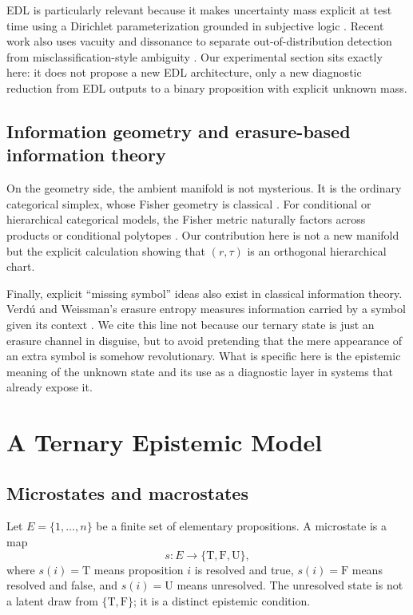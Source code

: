 \documentclass[11pt]{article}
\newcommand{\T}{\mathrm{T}}
\newcommand{\F}{\mathrm{F}}
\newcommand{\U}{\mathrm{U}}
\newcommand{\1}{\mathbf{1}}
\begin{document}
EDL is particularly relevant because it makes uncertainty mass explicit at test time using a Dirichlet parameterization grounded in subjective logic \citep{SensoyKaplanKandemir18}. Recent work also uses vacuity and dissonance to separate out-of-distribution detection from misclassification-style ambiguity \citep{AguilarRaducanuRadevaVanDeWeijer23}. Our experimental section sits exactly here: it does not propose a new EDL architecture, only a new diagnostic reduction from EDL outputs to a binary proposition with explicit unknown mass.

\subsection{Information geometry and erasure-based information theory}

On the geometry side, the ambient manifold is not mysterious. It is the ordinary categorical simplex, whose Fisher geometry is classical \citep{Amari16}. For conditional or hierarchical categorical models, the Fisher metric naturally factors across products or conditional polytopes \citep{MontufarRauhAy14}. Our contribution here is not a new manifold but the explicit calculation showing that $(r,\tau)$ is an orthogonal hierarchical chart.

Finally, explicit “missing symbol” ideas also exist in classical information theory. Verd\'u and Weissman's erasure entropy measures information carried by a symbol given its context \citep{VerduWeissman08}. We cite this line not because our ternary state is just an erasure channel in disguise, but to avoid pretending that the mere appearance of an extra symbol is somehow revolutionary. What is specific here is the epistemic meaning of the unknown state and its use as a diagnostic layer in systems that already expose it.

\section{A Ternary Epistemic Model}

\subsection{Microstates and macrostates}

Let $E=\{1,\dots,n\}$ be a finite set of elementary propositions. A microstate is a map
\[
 s:E\to\{\T,\F,\U\},
\]
where $s(i)=\T$ means proposition $i$ is resolved and true, $s(i)=\F$ means resolved and false, and $s(i)=\U$ means unresolved. The unresolved state is not a latent draw from $\{\T,\F\}$; it is a distinct epistemic condition.
\end{document}
